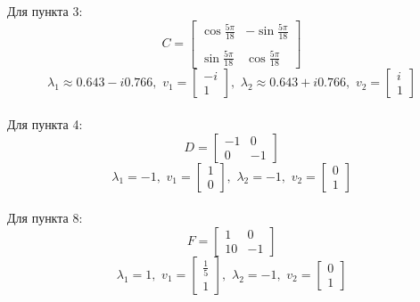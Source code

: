 \documentclass[a5paper, 10pt]{article}
\theoremstyle{definition}
\theoremstyle{plain}
\theoremstyle{remark}
\begin{document}
Для пункта 3:
\begin{equation}
C =
\begin{bmatrix}
\cos \frac{5\pi}{18} & -\sin \frac{5\pi}{18}\\
\\
\sin \frac{5\pi}{18} & \cos \frac{5\pi}{18}
\end{bmatrix}
\end{equation}
\begin{equation}
\lambda_1 \approx 0.643 - i 0.766, \, \,
v_1 =
\begin{bmatrix}
-i\\
1
\end{bmatrix}
, \, \,
\lambda_2 \approx 0.643 + i 0.766, \, \,
v_2 =
\begin{bmatrix}
i\\
1
\end{bmatrix}
\end{equation}
\\

Для пункта 4:
\begin{equation}
D =
\begin{bmatrix}
-1 & 0\\
0 & -1
\end{bmatrix}
\end{equation}
\begin{equation}
\lambda_1 = -1, \, \,
v_1 =
\begin{bmatrix}
1\\
0
\end{bmatrix}
, \, \,
\lambda_2 =  -1, \, \,
v_2 =
\begin{bmatrix}
0\\
1
\end{bmatrix}
\end{equation}
\\

Для пункта 8:
\begin{equation}
F =
\begin{bmatrix}
1 & 0\\
10 & -1
\end{bmatrix}
\end{equation}
\begin{equation}
\lambda_1 = 1, \, \,
v_1 =
\begin{bmatrix}
\frac{1}{5}\\
1
\end{bmatrix}
, \, \,
\lambda_2 =  -1, \, \,
v_2 =
\begin{bmatrix}
0\\
1
\end{bmatrix}
\end{equation}
\\
\end{document}

